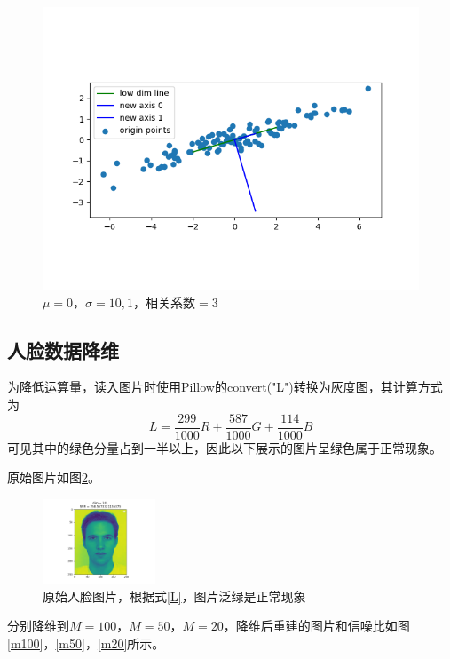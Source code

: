\begin{figure}[htbp]
\begin{minipage}[t]{0.3\linewidth}
        \includegraphics[width=\textwidth]{figures/Figure_12.png}
        \caption{$\mu=0$，$\sigma=10,1$，相关系数$=3$}
        \label{12}
    \end{minipage}
\end{figure}

\subsection{人脸数据降维}

为降低运算量，读入图片时使用Pillow的convert("L")转换为灰度图，其计算方式\cite{pillow}为
\begin{equation}
    L=\dfrac{299}{1000}R+\dfrac{587}{1000}G+\dfrac{114}{1000}B
    \label{L}
\end{equation}
可见其中的绿色分量占到一半以上，因此以下展示的图片呈绿色属于正常现象。

原始图片如图\ref{origin-img}。

\begin{figure}[htbp]
    \centering
    \includegraphics[width=0.3\textwidth]{figures/Figure_13.png}
    \caption{原始人脸图片，根据式\ref{L}，图片泛绿是正常现象}
    \label{origin-img}
\end{figure}

分别降维到$M=100$，$M=50$，$M=20$，降维后重建的图片和信噪比如图\ref{m100}，\ref{m50}，\ref{m20}所示。

